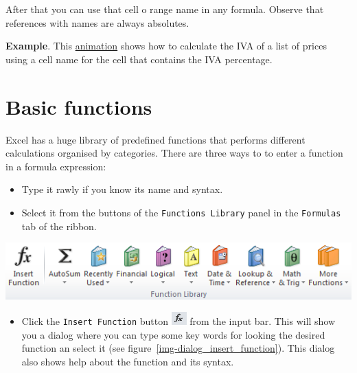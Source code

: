 After that you can use that cell o range name in any formula. Observe that references with names are always absolutes.

\textbf{Example}. This \href{http://aprendeconalf.es/office/excel/manual/img/example_formulas_with_defined_names.gif}{animation} shows how to calculate the IVA of a list of prices using a cell name for the cell that contains the IVA percentage.

\section{Basic functions}\hypertarget{basic-functions}{}\label{basic-functions}

Excel has a huge library of predefined functions that performs different calculations organised by categories. There are three ways to to enter a function in a formula expression:

\begin{itemize}
\item Type it rawly if you know its name and syntax.
\item Select it from the buttons of the \texttt{Functions Library} panel in the \texttt{Formulas} tab of the ribbon.
\end{itemize}

\begin{center}
\includegraphics[scale=0.7]{../img/panel_formulas.png}
\end{center}

\begin{itemize}
\item Click the \texttt{Insert Function} button \includegraphics[scale=0.7]{../img/button_insert_function.png} from the
input bar.
This will show you a dialog where you can type some key words for looking the desired function an select it (see
figure~\ref{img-dialog_insert_function}).
This dialog also shows help about the function and its syntax.
\end{itemize}

